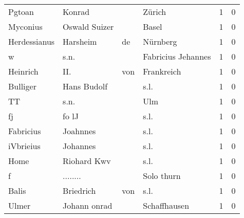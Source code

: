 \begin{tabular}{llllrr}
                   Pgtoan &                             Konrad &             &                                      Zürich &          1 &         0 \\
                 Myconius &                      Oswald Suizer &             &                                       Basel &          1 &         0 \\
             Herdessianus &                           Harsheim &          de &                                    Nürnberg &          1 &         0 \\
                        w &                               s.n. &             &                          Fabricius Jehannes &          1 &         0 \\
                 Heinrich &                                II. &         von &                                  Frankreich &          1 &         0 \\
                 Bulliger &                        Hans Budolf &             &                                        s.l. &          1 &         0 \\
                       TT &                               s.n. &             &                                         Ulm &          1 &         0 \\
                       fj &                              fo lJ &             &                                        s.l. &          1 &         0 \\
                Fabricius &                           Joahnnes &             &                                        s.l. &          1 &         0 \\
                iVbrieius &                           Johannes &             &                                        s.l. &          1 &         0 \\
                     Home &                        Riohard Kwv &             &                                        s.l. &          1 &         0 \\
                        f &                           ........ &             &                                  Solo thurn &          1 &         0 \\
                    Balis &                          Briedrich &         von &                                        s.l. &          1 &         0 \\
                    Ulmer &                       Johann onrad &             &                                Schaffhausen &          1 &         0 \\

\end{tabular}
